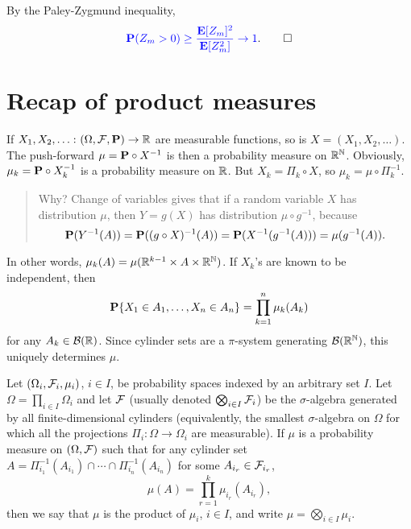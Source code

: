 \documentclass[12pt]{article}
\newcommand\highlight[1]{\textcolor{blue}{#1}}
\begin{document}
\begin{solution}
    By the Paley-Zygmund inequality, \[
        \highlight{\P(Z_m > 0) \ge \frac{\E[Z_m]^2}{\E[Z_m^2]} \to 1}.
        \qedhere
    \]
\end{solution}

\section*{Recap of product measures}
If $X_1, X_2, \dots\colon (\Omega, \F, \P) \to \R$ are measurable functions,
so is $X = (X_1, X_2, \dots)$.
The push-forward $\mu = {\P} \circ X^{-1}$ is then a probability measure on
$\R^\N$.
Obviously, $\mu_k = {\P} \circ X_k^{-1}$ is a probability measure on $\R$.
But $X_k = \Pi_k \circ X$, so $\mu_k = \mu \circ \Pi_k^{-1}$.
\begin{quote}
    Why? Change of variables gives that if a random variable $X$ has
    distribution $\mu$, then $Y = g(X)$ has distribution $\mu \circ g^{-1}$,
    because \[
        \P(Y^{-1}(A)) = \P((g \circ X)^{-1}(A))
            = \P(X^{-1}(g^{-1}(A)))
            = \mu(g^{-1}(A)).
    \]
\end{quote}
In other words, $\mu_k(A) = \mu(\R^{k-1} \times A \times \R^\N)$.
If $X_k$'s are known to be independent, then \[
    \P\set{X_1 \in A_1, \dots, X_n \in A_n}
        = \prod_{k=1}^n \mu_k(A_k)
\] for any $A_k \in \mcB(\R)$.
Since cylinder sets are a $\pi$-system generating $\mcB(\R^\N)$, this
uniquely determines $\mu$.

\begin{definition*} \label{def:product}
    Let $(\Omega_i, \mcF_i, \mu_i)$, $i \in I$, be probability spaces indexed
    by an arbitrary set $I$.
    Let $\Omega = \prod_{i \in I} \Omega_i$ and let $\mcF$ (usually denoted
    $\bigotimes_{i \in I} \mcF_i$) be the $\sigma$-algebra generated by all
    finite-dimensional cylinders (equivalently, the smallest
    $\sigma$-algebra on $\Omega$ for which all the projections
    $\Pi_i \colon \Omega \to \Omega_i$ are measurable).
    If $\mu$ is a probability measure on $(\Omega, \mcF)$ such that for any
    cylinder set
    $A = \Pi_{i_1}^{-1}(A_{i_1}) \cap \cdots \cap \Pi_{i_n}^{-1}(A_{i_n})$
    for some $A_{i_r} \in \mcF_{i_r}$, \[
        \mu(A) = \prod_{r=1}^k \mu_{i_r}(A_{i_r}),
    \] then we say that $\mu$ is the product of $\mu_i$, $i \in I$,
    and write $\mu = \bigotimes\limits_{i \in I} \mu_i$.
\end{definition*}
\end{document}
